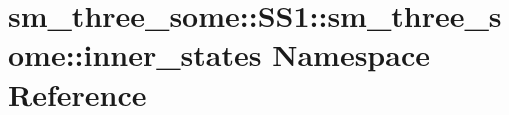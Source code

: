 \hypertarget{namespacesm__three__some_1_1SS1_1_1sm__three__some_1_1inner__states}{}\section{sm\+\_\+three\+\_\+some\+:\+:S\+S1\+:\+:sm\+\_\+three\+\_\+some\+:\+:inner\+\_\+states Namespace Reference}
\label{namespacesm__three__some_1_1SS1_1_1sm__three__some_1_1inner__states}
